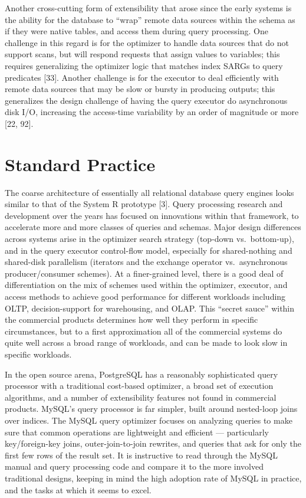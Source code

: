 \documentclass[a4paper,11pt,twoside,openright]{book}
\begin{document}
Another cross-cutting form of extensibility that arose since the early
systems is the ability for the database to ``wrap'' remote data sources
within the schema as if they were native tables, and access them during
query processing. One challenge in this regard is for the optimizer to
handle data sources that do not support scans, but will respond requests
that assign values to variables; this requires generalizing the
optimizer logic that matches index SARGs to query predicates {[}33{]}.
Another challenge is for the executor to deal efficiently with remote
data sources that may be slow or bursty in producing outputs; this
generalizes the design challenge of having the query executor do
asynchronous disk I/O, increasing the access-time variability by an
order of magnitude or more {[}22, 92{]}.

\hypertarget{standard-practice-2}{%
\section{Standard Practice}\label{standard-practice-2}}

The coarse architecture of essentially all relational database query
engines looks similar to that of the System R prototype {[}3{]}. Query
processing research and development over the years has focused on
innovations within that framework, to accelerate more and more classes
of queries and schemas. Major design differences across systems arise in
the optimizer search strategy (top-down vs.~bottom-up), and in the query
executor control-flow model, especially for shared-nothing and
shared-disk parallelism (iterators and the exchange operator
vs.~asynchronous producer/consumer schemes). At a finer-grained level,
there is a good deal of differentiation on the mix of schemes used
within the optimizer, executor, and access methods to achieve good
performance for different workloads including OLTP, decision-support for
warehousing, and OLAP. This ``secret sauce'' within the commercial
products determines how well they perform in specific circumstances, but
to a first approximation all of the commercial systems do quite well
across a broad range of workloads, and can be made to look slow in
specific workloads.

In the open source arena, PostgreSQL has a reasonably sophisticated
query processor with a traditional cost-based optimizer, a broad set of
execution algorithms, and a number of extensibility features not found
in commercial products. MySQL's query processor is far simpler, built
around nested-loop joins over indices. The MySQL query optimizer focuses
on analyzing queries to make sure that common operations are lightweight
and efficient --- particularly key/foreign-key joins, outer-join-to-join
rewrites, and queries that ask for only the first few rows of the result
set. It is instructive to read through the MySQL manual and query
processing code and compare it to the more involved traditional designs,
keeping in mind the high adoption rate of MySQL in practice, and the
tasks at which it seems to excel.
\end{document}
